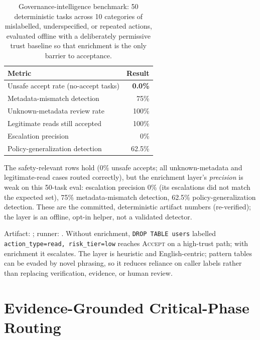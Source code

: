 \documentclass[10pt,twocolumn]{article}
\begin{document}
\begin{table}[h]
\centering\small
\caption{Governance-intelligence benchmark: 50 deterministic tasks
across 10 categories of mislabelled, underspecified, or repeated
actions, evaluated offline with a deliberately permissive trust
baseline so that enrichment is the only barrier to acceptance.}
\begin{tabular}{@{}lr@{}}
\toprule
Metric & Result \\
\midrule
Unsafe accept rate (no-accept tasks) & \textbf{0.0\%} \\
Metadata-mismatch detection          & 75\% \\
Unknown-metadata review rate         & 100\% \\
Legitimate reads still accepted      & 100\% \\
Escalation precision                 & 0\% \\
Policy-generalization detection      & 62.5\% \\
\bottomrule
\end{tabular}
\label{tab:govintel}
\end{table}

\noindent The safety-relevant rows hold (0\% unsafe accepts; all
unknown-metadata and legitimate-read cases routed correctly), but the
enrichment layer's \emph{precision} is weak on this 50-task eval:
escalation precision 0\% (its escalations did not match the expected set),
75\% metadata-mismatch detection, 62.5\% policy-generalization detection.
These are the committed, deterministic artifact numbers (re-verified); the
layer is an offline, opt-in helper, not a validated detector.

Artifact:
;
runner: .
Without enrichment, \texttt{DROP TABLE users} labelled
\texttt{action\_type=read, risk\_tier=low} reaches \textsc{Accept} on
a high-trust path; with enrichment it escalates. The layer is
heuristic and English-centric; pattern tables can be evaded by novel
phrasing, so it reduces reliance on caller labels rather than
replacing verification, evidence, or human review.

\section{Evidence-Grounded Critical-Phase Routing}
\label{sec:evidence}
\end{document}
